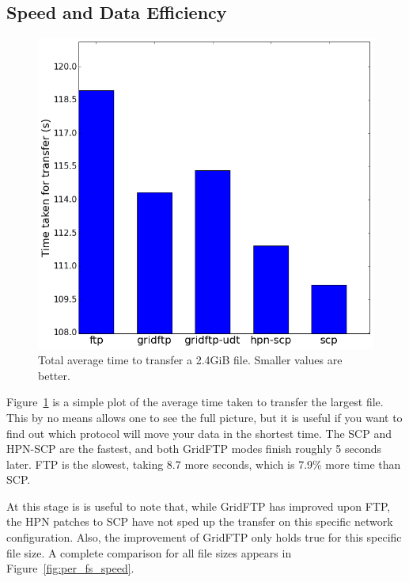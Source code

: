 \documentclass{sig-alternate-05-2015}
\begin{document}
\subsection{Speed and Data Efficiency}
\begin{figure}[h]
\centering
	\includegraphics[width=.8\linewidth]{img/time.png}
\caption{Total average time to transfer a 2.4GiB file. Smaller values are better.}
\label{fig:time}
\end{figure}

Figure~\ref{fig:time} is a simple plot of the average time taken to transfer the largest file. This by no means allows one to see the full picture, but it is useful if you want to find out which protocol will move your data in the shortest time. The SCP and HPN-SCP are the fastest, and both GridFTP modes finish roughly 5 seconds later. FTP is the slowest, taking 8.7 more seconds, which is 7.9\% more time than SCP.

At this stage is is useful to note that, while GridFTP has improved upon FTP, the HPN patches to SCP have not sped up the transfer on this specific network configuration. Also, the improvement of GridFTP only holds true for this specific file size. A complete comparison for all file sizes appears in Figure~\ref{fig:per_fs_speed}.
\end{document}
